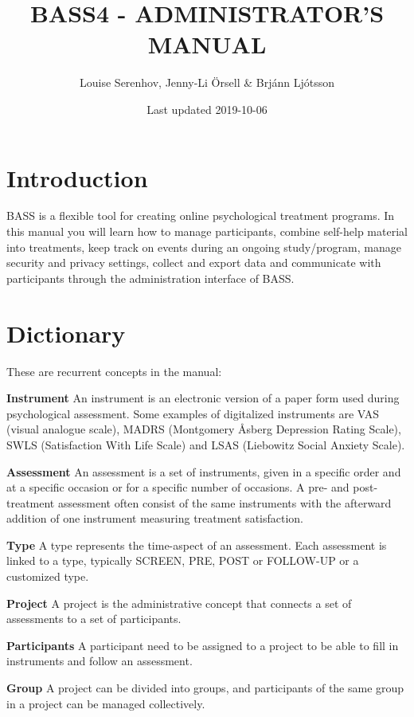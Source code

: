 \documentclass[]{book}
\title{BASS4 - ADMINISTRATOR'S MANUAL}
\author{Louise Serenhov, Jenny-Li Örsell \& Brjánn Ljótsson}
\date{Last updated 2019-10-06}
\begin{document}
\maketitle

{
\setcounter{tocdepth}{1}
\tableofcontents
}
\hypertarget{introduction}{%
\chapter{Introduction}\label{introduction}}

BASS is a flexible tool for creating online psychological treatment programs.
In this manual you will learn how to manage participants, combine self-help material into treatments, keep track on events during an ongoing study/program, manage security and privacy settings, collect and export data and communicate with participants through the administration interface of BASS.

\hypertarget{dictionary}{%
\chapter{Dictionary}\label{dictionary}}

These are recurrent concepts in the manual:

\textbf{Instrument}
An instrument is an electronic version of a paper form used during psychological assessment. Some examples of digitalized instruments are VAS (visual analogue scale), MADRS (Montgomery Åsberg Depression Rating Scale), SWLS (Satisfaction With Life Scale) and LSAS (Liebowitz Social Anxiety Scale).

\textbf{Assessment}
An assessment is a set of instruments, given in a specific order and at a specific occasion or for a specific number of occasions. A pre- and post-treatment assessment often consist of the same instruments with the afterward addition of one instrument measuring treatment satisfaction.

\textbf{Type}
A type represents the time-aspect of an assessment. Each assessment is linked to a type, typically SCREEN, PRE, POST or FOLLOW-UP or a customized type.

\textbf{Project}
A project is the administrative concept that connects a set of assessments to a set of participants.

\textbf{Participants}
A participant need to be assigned to a project to be able to fill in instruments and follow an assessment.

\textbf{Group}
A project can be divided into groups, and participants of the same group in a project can be managed collectively.
\end{document}
